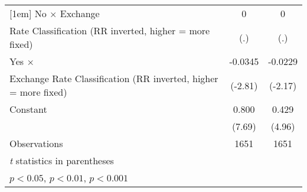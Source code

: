{\begin{tabular}{l*{2}{c}}
[1em]
No $\times$ Exchange&           0         &           0         \\
Rate Classification (RR inverted, higher = more fixed)&         (.)         &         (.)         \\
[1em]
Yes $\times$        &     -0.0345\sym{**} &     -0.0229\sym{*}  \\
Exchange Rate Classification (RR inverted, higher = more fixed)&     (-2.81)         &     (-2.17)         \\
[1em]
Constant            &       0.800\sym{***}&       0.429\sym{***}\\
                    &      (7.69)         &      (4.96)         \\
\hline
Observations        &        1651         &        1651         \\
\hline\hline
\multicolumn{3}{l}{\footnotesize \textit{t} statistics in parentheses}\\
\multicolumn{3}{l}{\footnotesize \sym{*} \(p<0.05\), \sym{**} \(p<0.01\), \sym{***} \(p<0.001\)}\\
\end{tabular}
}
